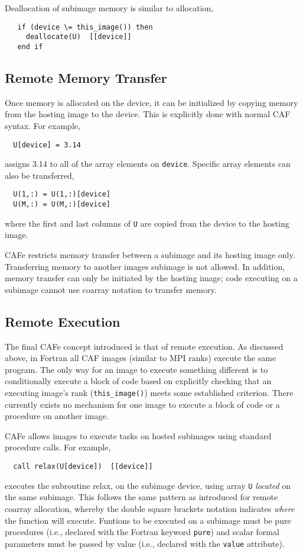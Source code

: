 Deallocation of subimage memory is similar to allocation,
\begin{verbatim}
   if (device \= this_image()) then
     deallocate(U)  [[device]]
   end if
\end{verbatim}


\subsection{Remote Memory Transfer}

Once memory is allocated on the device, it can be initialized by copying memory from the
hosting image to the device.  This is explicitly done with normal CAF syntax.  For example,
\begin{verbatim}
  U[device] = 3.14
\end{verbatim}
assigns 3.14 to all of the array elements on \texttt{device}.  Specific array elements
can also be transferred, 
\begin{verbatim}
  U(1,:) = U(1,:)[device]
  U(M,:) = U(M,:)[device]
\end{verbatim}
where the first and last columns of \texttt{U} are copied from the device to the hosting image.

CAFe restricts memory transfer between a subimage and its hosting image only. Transferring
memory to another images subimage is not allowed.  In addition, memory transfer can only be
initiated by the hosting image; code executing on a subimage cannot use coarray notation to
transfer memory.

\subsection{Remote Execution}

The final CAFe concept introduced is that of remote execution.  As discussed above, in
Fortran all CAF images (similar to MPI ranks) execute the same program.  The only way for
an image to execute something different is to conditionally execute a block of code based
on explicitly checking that an executing image's rank (\texttt{this\_image()}) meets some
established criterion.  There currently exists no mechanism for one image to execute a
block of code or a procedure on another image.

CAFe allows images to execute tasks on hosted subimages using standard procedure calls.
For example,
\begin{verbatim}
  call relax(U[device])  [[device]]
\end{verbatim}
executes the subroutine relax, on the subimage device, using array \texttt{U} \emph{located}
on the same subimage.  This follows the same pattern as introduced for remote coarray allocation,
whereby the double square brackets notation indicates \emph{where} the function will execute.
Funtions to be executed on a subimage must be pure procedures (i.e., declared with the Fortran
keyword \texttt{pure}) and scalar formal parameters must be passed by value (i.e., declared with the
\texttt{value} attribute).

